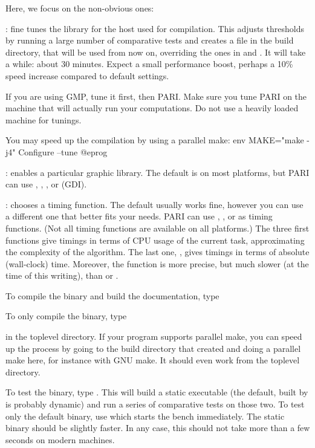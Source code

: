 Here, we focus on the non-obvious ones:

: fine tunes the library for the host used for compilation. This
adjusts thresholds by running a large number of comparative tests and creates
a file  in the build directory, that will be used from now on,
overriding the ones in  and . It
will take a while: about 30 minutes. Expect a small
performance boost, perhaps a 10\% speed increase
compared to default settings.

If you are using GMP, tune it first, then PARI. Make sure you tune PARI on
the machine that will actually run your computations. Do not use a heavily
loaded machine for tunings.

You may speed up the compilation by using a parallel make:
\bprog
  env MAKE="make -j4" Configure --tune
@eprog

: enables a particular graphic library.
The default is  on most platforms, but PARI can use
, , , or  (GDI).

: chooses a timing function. The default usually
works fine, however you can use a different one that better fits your needs.
PARI can use , ,  or
 as timing functions. (Not all timing functions are available on
all platforms.) The three first functions give timings in terms of CPU usage
of the current task, approximating the complexity of the algorithm. The last
one, , gives timings in terms of absolute (wall-clock) time.
Moreover, the  function is more precise, but much slower
(at the time of this writing), than  or .

 To compile the  binary and build the
documentation, type


\noindent To only compile the  binary, type


\noindent in the toplevel directory. If your  program supports
parallel make, you can speed up the process by going to the build
directory that  created and doing a parallel make here, for
instance  with GNU make. It should even work from the toplevel
directory.


To test the binary, type . This will build a static
executable (the default, built by  is probably dynamic) and
run a series of comparative tests on those two. To test only the default
binary, use  which starts the bench immediately.
The static binary should be slightly faster. In any case, this should not
take more than a few seconds on modern machines.


